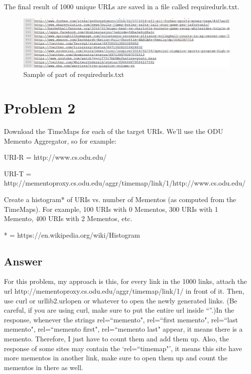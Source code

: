 \documentclass[12pt]{article}
\begin{document}

\newpage
The final result of 1000 unique URLs are saved in a file called requiredurls.txt. 

\begin{figure}[h]
\centering
\includegraphics[width=6.5in]{requiredurls.png}
\caption{Sample of part of requiredurls.txt}
\end{figure}

\section*{Problem 2}
Download the TimeMaps for each of the target URIs.  We'll use the ODU 
Memento Aggregator, so for example:

\noindent
URI-R = http://www.cs.odu.edu/

\noindent
URI-T = http://mementoproxy.cs.odu.edu/aggr/timemap/link/1/http://www.cs.odu.edu/

\noindent
Create a histogram* of URIs vs. number of Mementos (as computed from
the TimeMaps).  For example, 100 URIs with 0 Mementos, 300 URIs
with 1 Memento, 400 URIs with 2 Mementos, etc.

\noindent
* = https://en.wikipedia.org/wiki/Histogram
     
\subsection*{Answer}

For this problem, my approach is this, for every link in the 1000 links, attach the url http://mementoproxy.cs.odu.edu/aggr/timemap/link/1/ in front of it. Then, use curl or urllib2.urlopen or whatever to open the newly generated links. (Be careful, if you are using curl, make sure to put the entire url inside ``''.)In the response, whenever the strings rel=``memento", rel=``first memento", rel=``last memento", rel=``memento first", rel=``memento last" appear, it means there is a memento. Therefore, I just have to count them and add them up. Also, the response of some sites may contain the `rel=``timemap"', it means this site have more mementos in another link, make sure to open them up and count the mementos in there as well.
\end{document}
